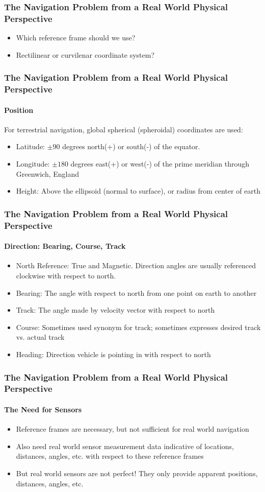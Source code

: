\begin{frame}
 \frametitle{The Navigation Problem from a Real World Physical Perspective}
\begin{itemize}
  \item Which reference frame should we use?
  \item Rectilinear or curvilenar coordinate system?
\end{itemize} 
\end{frame}

\begin{frame}
 \frametitle{The Navigation Problem from a Real World Physical Perspective}
\framesubtitle{Position}
For terrestrial navigation, global spherical (spheroidal) coordinates are used:
\begin{itemize}
  \item Latitude:  $\pm 90$ degrees north(+) or south(-) of the equator.
  \item Longitude: $\pm 180$ degrees east(+) or west(-) of the prime meridian through Greenwich, England
  \item Height:  Above the ellipsoid (normal to surface), or radius from center of earth
\end{itemize} 
\end{frame}

\begin{frame}
 \frametitle{The Navigation Problem from a Real World Physical Perspective}
\framesubtitle{Direction:  Bearing, Course, Track}
\begin{itemize}
  \item North Reference:  True and Magnetic. Direction angles are usually referenced clockwise with respect to north.
  \item  Bearing:  The angle with respect to north from one point on earth to another
  \item  Track:    The angle made by velocity vector with respect to north
  \item  Course:   Sometimes used synonym for track; sometimes expresses desired track vs. actual track
  \item  Heading:  Direction vehicle is pointing in with respect to north
\end{itemize} 
\end{frame}

\begin{frame}
 \frametitle{The Navigation Problem from a Real World Physical Perspective}
\framesubtitle{The Need for Sensors}
\begin{itemize}
  \item Reference frames are necessary, but not sufficient for real world navigation
  \item Also need real world sensor measurement data indicative of locations, distances, angles, etc. with respect to these reference frames
  \item But real world sensors are not perfect!  They only provide apparent positions, distances, angles, etc.
\end{itemize} 
\end{frame}
